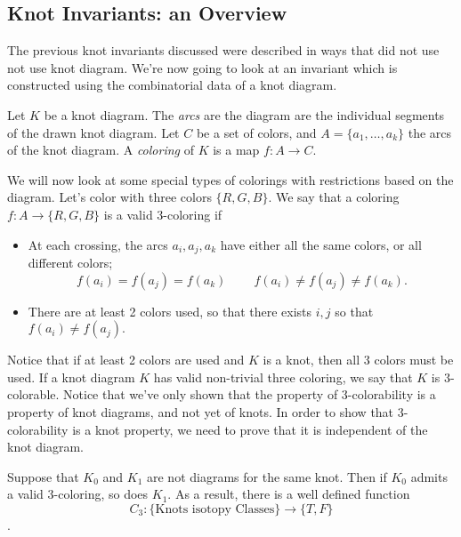 \subsection{Knot Invariants: an Overview}
The previous knot invariants discussed were described in ways that did not use not use knot diagram. We're now going to look at an invariant which is constructed using the combinatorial data of a knot diagram. \\
\begin{definition}
Let $K$ be a knot diagram. The \emph{arcs} are the diagram are the individual segments of the drawn knot diagram. Let $C$ be a set of colors, and  $A=\{a_1, \ldots, a_k\}$  the arcs of the knot diagram. A \emph{coloring} of $K$ is a map $f: A\to C$. 
\end{definition}
We will now look at some special types of colorings with restrictions based on the diagram. Let's color with three colors $\{R, G, B\}$.  We say that a coloring $f: A\to \{R, G, B\}$ is a valid 3-coloring if 
\begin{itemize}
\item At each crossing, the arcs $a_i, a_j, a_k$ have either all the same colors, or all different colors; \[f(a_i)=f(a_j)=f(a_k)\;\;\;\;\;\;\;\; f(a_i)\neq f(a_j)\neq f(a_k).\]
\item There are at least 2 colors used, so that there exists $i, j$ so that $f(a_i)\neq f(a_j).$
\end{itemize}
Notice that if at least 2 colors are used and $K$ is a knot, then all 3 colors must be used.  If a knot diagram $K$ has valid non-trivial three coloring, we say that $K$ is 3-colorable. Notice that we've only shown that the property of 3-colorability is a property of knot diagrams, and not yet of knots. In order to show that 3-colorability is a knot property, we need to prove that it is independent of the knot diagram. 
\begin{claim}
Suppose that $K_0$ and $K_1$ are not diagrams for the same knot. Then if $K_0$  admits a valid 3-coloring, so does $K_1$. As a result, there is a well defined function \[C_3: \{\text{Knots isotopy Classes}\}\to \{T, F\}\]. 
\end{claim}
